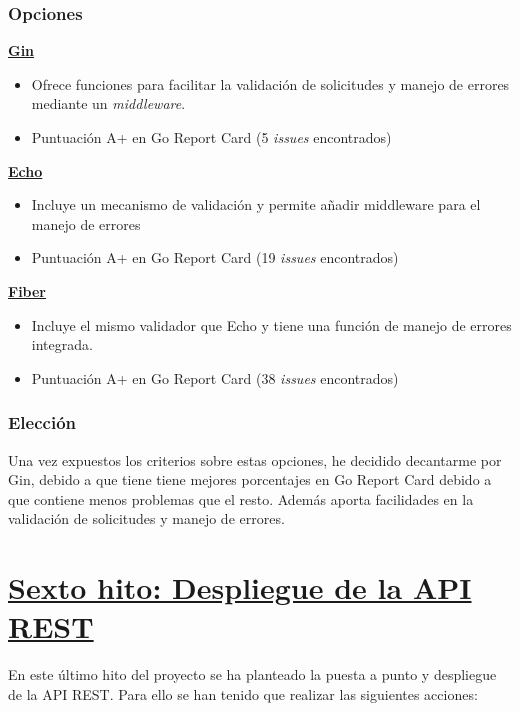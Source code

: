 \subsubsection{Opciones}

\textbf{\href{https://pkg.go.dev/github.com/gin-gonic/gin}{Gin} \cite{go-dev}}

\begin{itemize}
\item
  Ofrece funciones para facilitar la validación de solicitudes y manejo de errores mediante un \textit{middleware}.
\item
  Puntuación A+ en Go Report Card (5 \textit{issues} encontrados)
\end{itemize}

\textbf{\href{https://pkg.go.dev/github.com/labstack/echo/v4}{Echo} \cite{go-dev}}

\begin{itemize}
\item
  Incluye un mecanismo de validación y permite añadir middleware para el manejo de errores
\item
Puntuación A+ en Go Report Card (19 \textit{issues} encontrados)
\end{itemize}

\textbf{\href{https://pkg.go.dev/github.com/gofiber/fiber/v2}{Fiber} \cite{go-dev}}

\begin{itemize}
\item
  Incluye el mismo validador que Echo y tiene una función de manejo de errores integrada.
\item
Puntuación A+ en Go Report Card (38 \textit{issues} encontrados)
\end{itemize}

\subsubsection{Elección}

Una vez expuestos los criterios sobre estas opciones, he decidido decantarme por Gin, debido a que tiene tiene mejores porcentajes en Go Report Card debido a que contiene menos problemas que el resto.
Además aporta facilidades en la validación de solicitudes y manejo de errores.

\newpage

\section{\href{https://github.com/manujurado1/SportsBar-IV/tree/PMV-Despliegue_API}{Sexto hito: Despliegue de la API REST}}
En este último hito del proyecto se ha planteado la puesta a punto y despliegue de la API REST. Para ello se han tenido que realizar las siguientes acciones:

